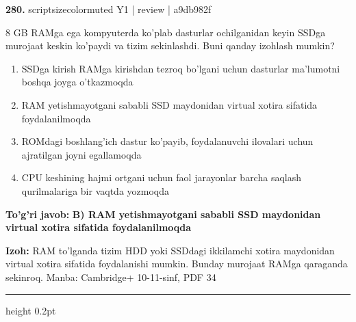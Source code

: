 \documentclass[10pt,a4paper]{article}
\begin{document}
{\bfseries\sffamily\color{ink} 280.} {scriptsizecolor{muted} Y1 | review | a9db982f}
\par
8 GB RAMga ega kompyuterda ko'plab dasturlar ochilganidan keyin SSDga murojaat keskin ko'paydi va tizim sekinlashdi. Buni qanday izohlash mumkin?
\begin{enumerate}[label=\Alph*),leftmargin=9mm]
\item SSDga kirish RAMga kirishdan tezroq bo'lgani uchun dasturlar ma'lumotni boshqa joyga o'tkazmoqda
\item RAM yetishmayotgani sababli SSD maydonidan virtual xotira sifatida foydalanilmoqda
\item ROMdagi boshlang'ich dastur ko'payib, foydalanuvchi ilovalari uchun ajratilgan joyni egallamoqda
\item CPU keshining hajmi ortgani uchun faol jarayonlar barcha saqlash qurilmalariga bir vaqtda yozmoqda
\end{enumerate}
\begin{tcolorbox}[enhanced,breakable,colback=teal!4,colframe=teal!60!black,boxrule=0.45pt,arc=1.2mm,left=2.7mm,right=2.7mm,top=1.8mm,bottom=1.8mm,before skip=2mm,after skip=2mm]
{\bfseries\sffamily\color{teal}To'g'ri javob:} \textbf{B) RAM yetishmayotgani sababli SSD maydonidan virtual xotira sifatida foydalanilmoqda}
\par\smallskip
{\bfseries Izoh:} RAM to'lganda tizim HDD yoki SSDdagi ikkilamchi xotira maydonidan virtual xotira sifatida foydalanishi mumkin. Bunday murojaat RAMga qaraganda sekinroq. Manba: Cambridge+ 10-11-sinf, PDF 34
\end{tcolorbox}
\vspace{2mm}\hrule height 0.2pt\vspace{3mm}
\end{document}
